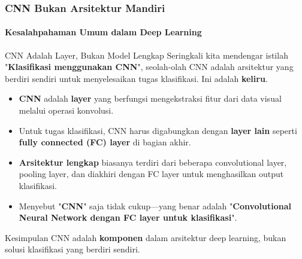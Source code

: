\documentclass[t,aspectratio=169,xcolor=dvipsnames]{beamer}
\begin{document}
\begin{frame}
    \frametitle{CNN Bukan Arsitektur Mandiri}
    \framesubtitle{Kesalahpahaman Umum dalam Deep Learning}
    \footnotesize

    \begin{alertblock}{CNN Adalah Layer, Bukan Model Lengkap}
        Seringkali kita mendengar istilah "\textbf{Klasifikasi menggunakan CNN}", seolah-olah CNN adalah arsitektur yang berdiri sendiri untuk menyelesaikan tugas klasifikasi. Ini adalah \textbf{keliru}.
    \end{alertblock}

    \begin{itemize}
        \item \textbf{CNN} adalah \textbf{layer} yang berfungsi mengekstraksi fitur dari data visual melalui operasi konvolusi.
        \item Untuk tugas klasifikasi, CNN harus digabungkan dengan \textbf{layer lain} seperti \textbf{fully connected (FC) layer} di bagian akhir.
        \item \textbf{Arsitektur lengkap} biasanya terdiri dari beberapa convolutional layer, pooling layer, dan diakhiri dengan FC layer untuk menghasilkan output klasifikasi.
        \item Menyebut "\textbf{CNN}" saja tidak cukup—yang benar adalah "\textbf{Convolutional Neural Network dengan FC layer untuk klasifikasi}".
    \end{itemize}

    \begin{block}{Kesimpulan}
        CNN adalah \textbf{komponen} dalam arsitektur deep learning, bukan solusi klasifikasi yang berdiri sendiri.
    \end{block}
\end{frame}
\end{document}
